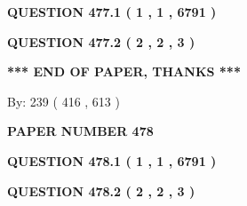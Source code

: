 \documentclass[12pt]{article}
\begin{document}
 
 
 
   
   
  
\vspace{0.2in}
  
{\textbf{\Large{QUESTION
477.1 
 ( 1 , 1 , 6791 )
}}}
  
  
  
\vspace{0.2in}
  
{\textbf{\Large{QUESTION
477.2 
 ( 2 , 2 , 3 )
}}}
  
  
   
   
 \vspace{0.2in}
 
   
   
   
   
\vspace{1.0in} 
{\textbf{\large{ *** END OF PAPER, THANKS *** }}} 
   
   
\hspace{1.0in} By: 
 239 ( 416 ,  613 )
   
   
   
   
\newpage 
\setcounter{page}{ 
   478001 } 
   
   
   
   
 {\textbf{ \Large{ PAPER NUMBER  478  }}}
   
   
\vspace{0.2in}
   
   
   
   
   
   
 \vspace{0.2in}
 
 
 
 
   
   
  
\vspace{0.2in}
  
{\textbf{\Large{QUESTION
478.1 
 ( 1 , 1 , 6791 )
}}}
  
  
  
\vspace{0.2in}
  
{\textbf{\Large{QUESTION
478.2 
 ( 2 , 2 , 3 )
}}}
  
  
   
   
 \vspace{0.2in}
 
   
   
   
   
\end{document}
